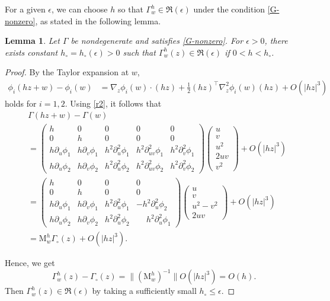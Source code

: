 \documentclass[10pt] %
{amsart}
\theoremstyle{plain}
\newtheorem{lem}[thm]{Lemma}
\numberwithin{equation}{section}
\begin{document}
For a given $\epsilon$, we can choose $h$ so that $\Gamma_w^h \in \mathfrak R (\epsilon)$ under the condition \eqref{G-nonzero}, as stated in the following lemma. 
  
\begin{lem}\label{lem:normal}
Let $\Gamma$ be nondegenerate and satisfies \eqref{G-nonzero}.  
For $\epsilon>0$, there exists constant $h_\circ=h_\circ(\epsilon )>0$ such that $\Gamma_{w}^h(z) \in \mathfrak R (\epsilon ) $ if $ 0< h < h_\circ$.
\end{lem}

\begin{proof}
By the Taylor expansion at $w$, 
\begin{align*}
 \phi_i (hz+w)  -  \phi_i(w) 
 &=   \nabla_{z}\phi_i(w)\cdot (hz) +   \frac {1}{2}( hz)^\intercal   \nabla_z^2 {\phi_i}(w)   (hz) + O(|hz|^3)
\end{align*}
holds for $i=1,2$. 
Using \eqref{r2}, it follows that 
\begin{align*}
&  \Gamma ( hz+w ) - \Gamma(w) \\   
&= \begin{pmatrix}  
h&0&0&0&0  \\  0&h&0&0&0 \\ 
h\partial_u \phi_1  & h\partial_v \phi_1   &  h^2\partial_{u}^2 \phi_1 & h^2\partial_{uv}^2 \phi_1 & h^2\partial_{v}^2 \phi_1 \\ 
h\partial_{u } \phi_2 & h\partial_{v } \phi_2   &  h^2\partial_{u}^2 \phi_2 & h^2\partial_{uv}^2 \phi_2 & h^2\partial_{v}^2 \phi_2   
\end{pmatrix} 
\begin{pmatrix}  u \\  v \\ u^2  \\ 2uv \\ v^2 \end{pmatrix} + O(|hz|^3)  \\
&= \begin{pmatrix}  h&0&0&0  \\  0&h&0&0 \\ 
h\partial_u \phi_1  & h\partial_v \phi_1    & h^2 \partial_u^2\phi_1   &  -h^2\partial_u^2\phi_2  \\ 
h\partial_{u } \phi_2  & h\partial_{v } \phi_2   & h^2 \partial_u^2\phi_2   &  \phantom{-}h^2\partial_u^2\phi_1     \end{pmatrix} \begin{pmatrix}  u \\  v \\ u^2 -v^2  \\ 2uv   \end{pmatrix} + O(|hz|^3) \\[1ex]
& = \mathrm M_w^h \Gamma_\circ(z)  + O(|hz|^3).
\end{align*}

Hence, we get
\[
\Gamma_w^h(z) - \Gamma_\circ(z) =  \|(\mathrm M_w^h)^{-1}\|  O(|hz|^3)  =  O(h).
\] 
Then  $\Gamma_w^h(z) \in \mathfrak R(\epsilon)$ by taking a sufficiently small $h_\circ \le \epsilon$.
\end{proof} 
\end{document}
